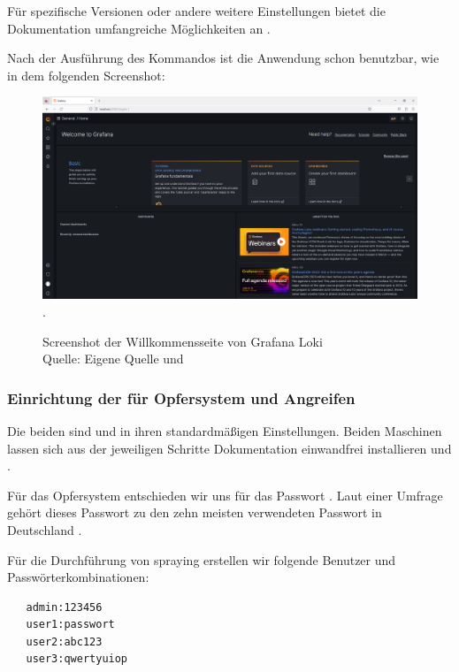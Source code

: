 Für spezifische Versionen oder andere weitere Einstellungen bietet die Dokumentation umfangreiche Möglichkeiten an \citep{Grafana_run}.

\newpage
\thispagestyle{lscape}
\begin{landscape}
   Nach der Ausführung des Kommandos ist die Anwendung schon benutzbar, wie in dem folgenden Screenshot:
   \begin{center}
      \begin{figure}[H]
         \centering
         \includegraphics[width=1.3\textwidth]{assets/Installation_Grafana.png}.
         \caption{Screenshot der Willkommensseite von Grafana Loki\\Quelle: Eigene Quelle und \citep{Grafana_Logs}}
         \centering
      \end{figure}
   \end{center}
\end{landscape}

\subsubsection{Einrichtung der  für Opfersystem und Angreifen}
Die beiden  sind  und  in ihren standardmäßigen Einstellungen. Beiden Maschinen lassen sich aus der jeweiligen Schritte Dokumentation einwandfrei installieren \citep{kali_vm} und \citep{Ubuntu_server}.

Für das Opfersystem entschieden wir uns für das Passwort . Laut einer Umfrage gehört dieses Passwort zu den zehn meisten verwendeten Passwort in Deutschland \citep{silicon_passwort}.  

Für die Durchführung von \gls{spraying} erstellen wir folgende Benutzer und Passwörterkombinationen:
{
\begin{verbatim}
   admin:123456
   user1:passwort
   user2:abc123
   user3:qwertyuiop
\end{verbatim}
}

